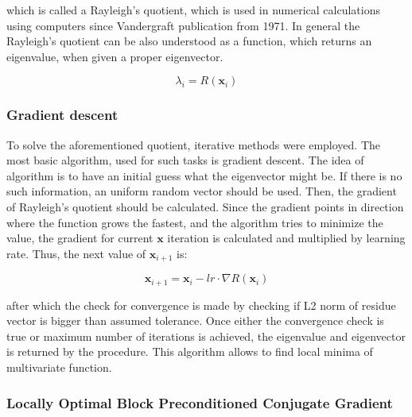 \noindent which is called a Rayleigh's quotient, which is used in numerical calculations using computers since Vandergraft \cite{vandergraft1971} publication from 1971. In general the Rayleigh's quotient can be also understood as a function, which returns an eigenvalue, when given a proper eigenvector.

\begin{equation}
	\lambda_i = R(\textbf{x}_i)
\end{equation}

\noindent

\subsubsection{Gradient descent}

To solve the aforementioned quotient, iterative methods were employed. The most basic algorithm, used for such tasks is gradient descent.\cite{gradient_descent} The idea of algorithm is to have an initial guess what the eigenvector might be. If there is no such information, an uniform random vector should be used. Then, the gradient of Rayleigh's quotient should be calculated. Since the gradient points in direction where the function grows the fastest, and the algorithm tries to minimize the value, the gradient for current $\textbf{x}$ iteration is calculated and multiplied by learning rate. Thus, the next value of $\textbf{x}_{i+1}$ is:

\begin{equation}
	\textbf{x}_{i+1} = \textbf{x}_{i} - lr \cdot \nabla R(\textbf{x}_{i})
\end{equation}

\noindent after which the check for convergence is made by checking if L2 norm of residue vector is bigger than assumed tolerance. Once either the convergence check is true or maximum number of iterations is achieved, the eigenvalue and eigenvector is returned by the procedure. This algorithm allows to find local minima of multivariate function.

\subsubsection{Locally Optimal Block Preconditioned Conjugate Gradient}

